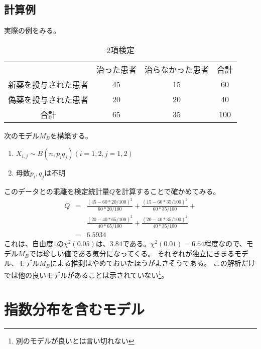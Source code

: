\subsection{計算例}
実際の例をみる。

\begin{table}[hbtp]
 \caption{2項検定}
\begin{tabular}{c|cc|c}
 & 治った患者 & 治らなかった患者 & 合計 \\
 新薬を投与された患者&45 & 15& 60  \\
 偽薬を投与された患者&20 & 20 & 40 \\
 合計 & 65& 35& 100
\end{tabular}
\end{table}

次のモデル$M_B$を構築する。
\begin{enumerate}
 \item $X_{i,j} \sim B(n,p_i q_j) (i=1,2,j=1,2)$
 \item 母数$p_i,q_j$は不明
\end{enumerate}
このデータとの乖離を検定統計量$Q$を計算することで確かめてみる。
\begin{eqnarray*}
 Q &=& \frac{(45-60*20/100)^2}{60*20/100} +\frac{(15-60*35/100)^2}{60*35/100} + \\
&&\frac{(20-40*65/100)^2}{40*65/100} + 
\frac{(20-40*35/100)^2}{40*35/100} \\
&=& 6.5934
\end{eqnarray*}
これは、自由度$1$の$\chi^2(0.05)$は、$3.84$である。$\chi^2(0.01)=6.64$程度なので、モデル$M_B$では珍しい値である気分になってくる。
それぞれが独立にきまるモデル、モデル$M_B$による推測はやめておいたほうがよさそうである。
この解析だけでは他の良いモデルがあることは示されていない\footnote{別のモデルが良いとは言い切れない}。

\begin{comment}
 = (45-60*65/100)^2/(60*65/100)+(15-60*35/100)^2/(60*35/100)+(20-40*65/100)^2/(40*65/100) + (20-40*35/100)^2/(40*35/100)
 = 6.5934
\end{comment}



\section{指数分布を含むモデル}

